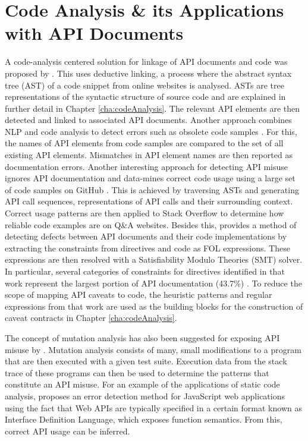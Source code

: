 \section{Code Analysis \& its Applications with API Documents}
\label{sec:related-static-code-analysis}
A code-analysis centered solution for linkage of API documents and code was proposed by \cite{live-api-doc}. This uses deductive linking, a process where the abstract syntax tree (AST) of a code snippet from online websites is analysed. ASTs are tree representations of the syntactic structure of source code and are explained in further detail in Chapter \ref{cha:codeAnalysis}. The relevant API elements are then detected and linked to associated API documents. Another approach combines NLP and code analysis to detect errors such as obsolete code samples \cite{zhong2013detecting}. For this, the names of API elements from code samples are compared to the set of all existing API elements. Mismatches in API element names are then reported as documentation errors. Another interesting approach for detecting API misuse ignores API documentation and data-mines correct code usage using a large set of code samples on GitHub \cite{code-examples}. This is achieved by traversing ASTs and generating API call sequences, representations of API calls and their surrounding context. Correct usage patterns are then applied to Stack Overflow to determine how reliable code examples are on Q\&A websites. Besides this, \cite{zhou-directive} provides a method of detecting defects between API documents and their code implementations by extracting the constraints from directives and code as FOL expressions. These expressions are then resolved with a Satisfiability Modulo Theories (SMT) solver. In particular, several categories of constraints for directives identified in that work represent the largest portion of API documentation (43.7\%) \cite{monperrus2012should}. To reduce the scope of mapping API caveats to code, the heuristic patterns and regular expressions from that work are used as the building blocks for the construction of caveat contracts in Chapter \ref{cha:codeAnalysis}. \bigbreak

The concept of mutation analysis has also been suggested for exposing API misuse by \cite{mutation-analysis}. Mutation analysis consists of many, small modifications to a program that are then executed with a given test suite. Execution data from the stack trace of these programs can then be used to determine the patterns that constitute an API misuse. For an example of the applications of static code analysis, \cite{bae2014safewapi} proposes an error detection method for JavaScript web applications using the fact that Web APIs are typically specified in a certain format known as Interface Definition Language, which exposes function semantics. From this, correct API usage can be inferred.
\clearpage
